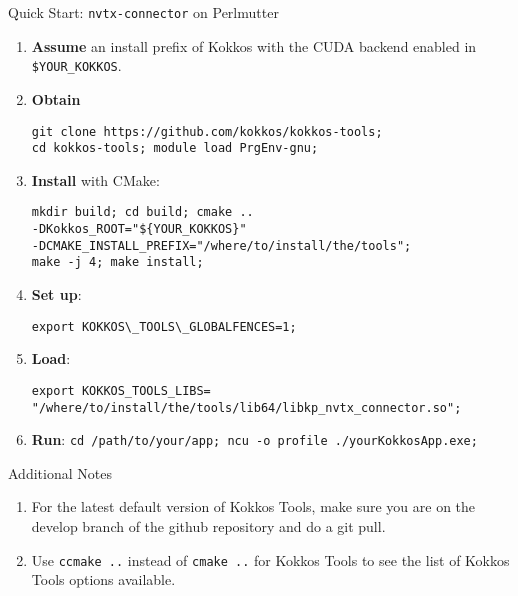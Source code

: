 \begin{frame}[fragile]{Quick Start: \texttt{nvtx-connector} on Perlmutter}

\begin{enumerate}
\small 

\item \textbf{Assume} an install prefix of Kokkos with the CUDA backend enabled in \texttt{\${YOUR\_KOKKOS}}.\\
\item \textbf{Obtain}
\begin{lstlisting}
git clone https://github.com/kokkos/kokkos-tools;
cd kokkos-tools; module load PrgEnv-gnu;
\end{lstlisting}
\item \textbf{Install} with CMake:
\begin{lstlisting}
mkdir build; cd build; cmake ..
-DKokkos_ROOT="${YOUR_KOKKOS}"
-DCMAKE_INSTALL_PREFIX="/where/to/install/the/tools";
make -j 4; make install;
\end{lstlisting}

\item \textbf{Set up}: 
\begin{lstlisting} 
export KOKKOS\_TOOLS\_GLOBALFENCES=1;
\end{lstlisting}

\item \textbf{Load}:
\begin{lstlisting}
export KOKKOS_TOOLS_LIBS=
"/where/to/install/the/tools/lib64/libkp_nvtx_connector.so";
\end{lstlisting}

\item \textbf{Run}: \texttt{cd /path/to/your/app; ncu -o profile ./yourKokkosApp.exe;}
\end{enumerate}
\end{frame}


\begin{frame}[fragile]{Additional Notes}
	\begin{enumerate}
	   \item For the latest default version of Kokkos Tools, make sure you are on the develop branch of the github repository and do a git pull.
	   \item Use \texttt{ccmake ..} instead of \texttt{cmake ..} for Kokkos Tools to see the list of Kokkos Tools options available.
	\end{enumerate}
\end{frame}


